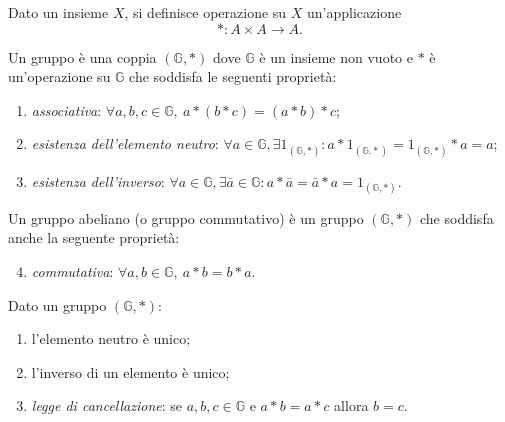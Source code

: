 
\begin{definition}[Operazione]
	Dato un insieme $ X $, si definisce operazione su $ X $ un'applicazione \[* \colon A \times A \to A.\]
\end{definition}

\begin{definition}[Gruppo]
	Un gruppo è una coppia $ (\mathbb{G}, *) $ dove $ \mathbb{G} $ è un insieme non vuoto e $ * $ è un'operazione su $ \mathbb{G} $ che soddisfa le seguenti proprietà:
	\begin{enumerate}[label = (\roman*)]
		\item \emph{associativa}: $ \forall a, b, c \in \mathbb{G}, \ a * (b * c) = (a * b) * c $;
		\item \emph{esistenza dell'elemento neutro}: $ \forall a \in \mathbb{G}, \exists 1_{(\mathbb{G}, *)} : a * 1_{(\mathbb{G}. *)} = 1_{(\mathbb{G}, *)} * a = a $;
		\item \emph{esistenza dell'inverso}: $ \forall a \in \mathbb{G}, \exists \bar{a} \in \mathbb{G} : a * \bar{a} = \bar{a} * a = 1_{(\mathbb{G}, *)} $.
	\end{enumerate}
\end{definition}

\begin{definition}
	Un gruppo abeliano (o gruppo commutativo) è un gruppo $ (\mathbb{G}, *) $ che soddisfa anche la seguente proprietà:
	\begin{enumerate}[label = (\roman*)]
		\setcounter{enumi}{3}
		\item \emph{commutativa}: $ \forall a, b \in \mathbb{G}, \ a * b = b * a $.
	\end{enumerate}
\end{definition}

\begin{thm}
	Dato un gruppo $ (\mathbb{G}, *) $:
	\begin{enumerate}
		\item l'elemento neutro è unico;
		\item l'inverso di un elemento è unico;
		\item \emph{legge di cancellazione}: se $ a, b, c \in \mathbb{G} $ e $ a * b = a * c $ allora $ b = c $.
	\end{enumerate}
\end{thm}

